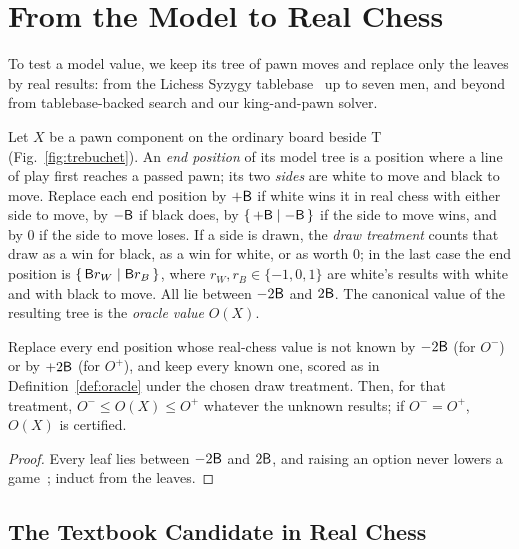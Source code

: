\section{From the Model to Real Chess}\label{sec:real}

To test a model value, we keep its tree of pawn moves and replace only the leaves by real results: from the
Lichess Syzygy tablebase~\cite{LichessTB} up to seven men, and beyond from tablebase-backed search and our
king-and-pawn solver.

\begin{definition}\label{def:oracle}
Let $X$ be a pawn component on the ordinary board beside T (Fig.~\ref{fig:trebuchet}). An \emph{end position}
of its model tree is a position where a line of play first reaches a passed pawn; its two \emph{sides} are
white to move and black to move. Replace each end position by $+\mathsf{B}$ if white wins it in real chess with either
side to move, by $-\mathsf{B}$ if black does, by $\{\,+\mathsf{B} \mid -\mathsf{B}\,\}$ if the side to move wins, and by $0$ if the
side to move loses. If a side is drawn, the \emph{draw treatment} counts that draw as a win for black, as a win
for white, or as worth $0$; in the last case the end position is $\{\,\mathsf{B} r_W \mid \mathsf{B} r_B\,\}$, where
$r_W,r_B\in\{-1,0,1\}$ are white's results with white and with black to move. All lie between $-2\mathsf{B}$ and $2\mathsf{B}$. The canonical value of the resulting tree is the \emph{oracle value} $O(X)$.
\end{definition}

\begin{lemma}\label{lem:sandwich}
Replace every end position whose real-chess value is not known by $-2\mathsf{B}$ (for $O^-$) or by $+2\mathsf{B}$ (for
$O^+$), and keep every known one, scored as in Definition~\ref{def:oracle} under the chosen draw treatment. Then, for that treatment, $O^-\le O(X)\le O^+$ whatever the unknown results; if $O^-=O^+$,
$O(X)$ is certified.
\end{lemma}
\begin{proof}
Every leaf lies between $-2\mathsf{B}$ and $2\mathsf{B}$, and raising an option never lowers a
game~\cite{Siegel2013}; induct from the leaves.
\end{proof}

\subsection{The Textbook Candidate in Real Chess}\label{sec:real-cand}

